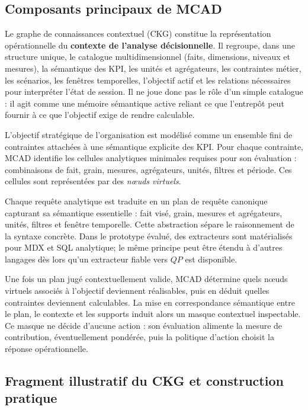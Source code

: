 \documentclass[journal]{IEEEtran}
\begin{document}
\subsection{Composants principaux de MCAD}

Le graphe de connaissances contextuel (CKG) constitue la représentation opérationnelle du \textbf{contexte de l'analyse décisionnelle}. Il regroupe, dans une structure unique, le catalogue multidimensionnel (faits, dimensions, niveaux et mesures), la sémantique des KPI, les unités et agrégateurs, les contraintes métier, les scénarios, les fenêtres temporelles, l'objectif actif et les relations nécessaires pour interpréter l'état de session. Il ne joue donc pas le rôle d'un simple catalogue : il agit comme une mémoire sémantique active reliant ce que l'entrepôt peut fournir à ce que l'objectif exige de rendre calculable.

L'objectif stratégique de l'organisation est modélisé comme un ensemble fini de contraintes attachées à une sémantique explicite des KPI. Pour chaque contrainte, MCAD identifie les cellules analytiques minimales requises pour son évaluation : combinaisons de fait, grain, mesures, agrégateurs, unités, filtres et période. Ces cellules sont représentées par des \emph{nœuds virtuels}.

Chaque requête analytique est traduite en un plan de requête canonique capturant sa sémantique essentielle : fait visé, grain, mesures et agrégateurs, unités, filtres et fenêtre temporelle. Cette abstraction sépare le raisonnement de la syntaxe concrète. Dans le prototype évalué, des extracteurs sont matérialisés pour MDX et SQL analytique; le même principe peut être étendu à d'autres langages dès lors qu'un extracteur fiable vers $QP$ est disponible.

Une fois un plan jugé contextuellement valide, MCAD détermine quels nœuds virtuels associés à l'objectif deviennent réalisables, puis en déduit quelles contraintes deviennent calculables. La mise en correspondance sémantique entre le plan, le contexte et les supports induit alors un masque contextuel inspectable. Ce masque ne décide d'aucune action : son évaluation alimente la mesure de contribution, éventuellement pondérée, puis la politique d'action choisit la réponse opérationnelle.

\subsection{Fragment illustratif du CKG et construction pratique}
\end{document}
